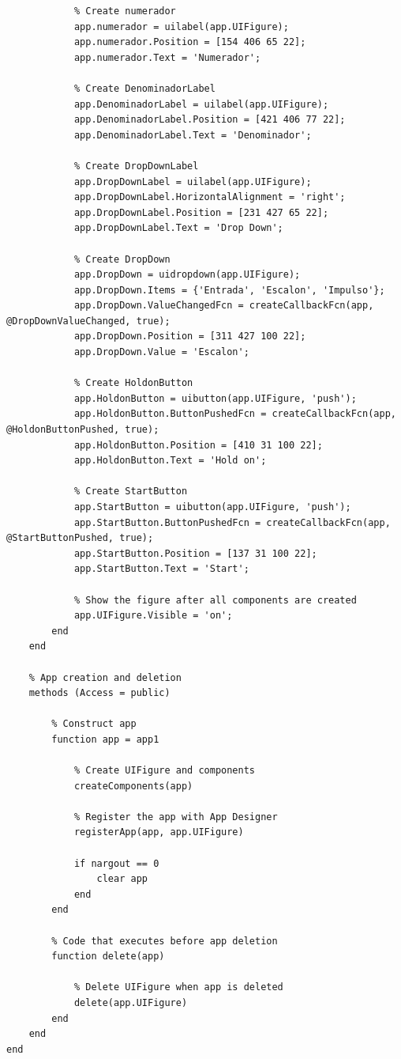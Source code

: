 \begin{lstlisting}
            % Create numerador
            app.numerador = uilabel(app.UIFigure);
            app.numerador.Position = [154 406 65 22];
            app.numerador.Text = 'Numerador';

            % Create DenominadorLabel
            app.DenominadorLabel = uilabel(app.UIFigure);
            app.DenominadorLabel.Position = [421 406 77 22];
            app.DenominadorLabel.Text = 'Denominador';

            % Create DropDownLabel
            app.DropDownLabel = uilabel(app.UIFigure);
            app.DropDownLabel.HorizontalAlignment = 'right';
            app.DropDownLabel.Position = [231 427 65 22];
            app.DropDownLabel.Text = 'Drop Down';

            % Create DropDown
            app.DropDown = uidropdown(app.UIFigure);
            app.DropDown.Items = {'Entrada', 'Escalon', 'Impulso'};
            app.DropDown.ValueChangedFcn = createCallbackFcn(app, @DropDownValueChanged, true);
            app.DropDown.Position = [311 427 100 22];
            app.DropDown.Value = 'Escalon';

            % Create HoldonButton
            app.HoldonButton = uibutton(app.UIFigure, 'push');
            app.HoldonButton.ButtonPushedFcn = createCallbackFcn(app, @HoldonButtonPushed, true);
            app.HoldonButton.Position = [410 31 100 22];
            app.HoldonButton.Text = 'Hold on';

            % Create StartButton
            app.StartButton = uibutton(app.UIFigure, 'push');
            app.StartButton.ButtonPushedFcn = createCallbackFcn(app, @StartButtonPushed, true);
            app.StartButton.Position = [137 31 100 22];
            app.StartButton.Text = 'Start';

            % Show the figure after all components are created
            app.UIFigure.Visible = 'on';
        end
    end

    % App creation and deletion
    methods (Access = public)

        % Construct app
        function app = app1

            % Create UIFigure and components
            createComponents(app)

            % Register the app with App Designer
            registerApp(app, app.UIFigure)

            if nargout == 0
                clear app
            end
        end

        % Code that executes before app deletion
        function delete(app)

            % Delete UIFigure when app is deleted
            delete(app.UIFigure)
        end
    end
end
\end{lstlisting}




